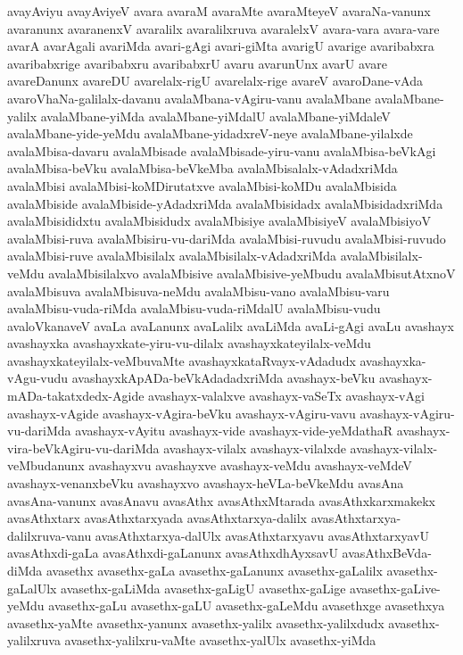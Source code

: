 {avayAviyu
avayAviyeV
avara
avaraM
avaraMte
avaraMteyeV
avaraNa-vanunx
avaranunx
avaranenxV
avaralilx
avaralilxruva
avaralelxV
avara-vara
avara-vare
avarA
avarAgali
avariMda
avari-gAgi
avari-giMta
avarigU
avarige
avaribabxra
avaribabxrige
avaribabxru
avaribabxrU
avaru
avarunUnx
avarU
avare
avareDanunx
avareDU
avarelalx-rigU
avarelalx-rige
avareV
avaroDane-vAda
avaroVhaNa-galilalx-davanu
avalaMbana-vAgiru-vanu
avalaMbane
avalaMbane-yalilx
avalaMbane-yiMda
avalaMbane-yiMdalU
avalaMbane-yiMdaleV
avalaMbane-yide-yeMdu
avalaMbane-yidadxreV-neye
avalaMbane-yilalxde
avalaMbisa-davaru
avalaMbisade
avalaMbisade-yiru-vanu
avalaMbisa-beVkAgi
avalaMbisa-beVku
avalaMbisa-beVkeMba
avalaMbisalalx-vAdadxriMda
avalaMbisi
avalaMbisi-koMDirutatxve
avalaMbisi-koMDu
avalaMbisida
avalaMbiside
avalaMbiside-yAdadxriMda
avalaMbisidadx
avalaMbisidadxriMda
avalaMbisididxtu
avalaMbisidudx
avalaMbisiye
avalaMbisiyeV
avalaMbisiyoV
avalaMbisi-ruva
avalaMbisiru-vu-dariMda
avalaMbisi-ruvudu
avalaMbisi-ruvudo
avalaMbisi-ruve
avalaMbisilalx
avalaMbisilalx-vAdadxriMda
avalaMbisilalx-veMdu
avalaMbisilalxvo
avalaMbisive
avalaMbisive-yeMbudu
avalaMbisutAtxnoV
avalaMbisuva
avalaMbisuva-neMdu
avalaMbisu-vano
avalaMbisu-varu
avalaMbisu-vuda-riMda
avalaMbisu-vuda-riMdalU
avalaMbisu-vudu
avaloVkanaveV
avaLa
avaLanunx
avaLalilx
avaLiMda
avaLi-gAgi
avaLu
avashayx
avashayxka
avashayxkate-yiru-vu-dilalx
avashayxkateyilalx-veMdu
avashayxkateyilalx-veMbuvaMte
avashayxkataRvayx-vAdadudx
avashayxka-vAgu-vudu
avashayxkApADa-beVkAdadadxriMda
avashayx-beVku
avashayx-mADa-takatxdedx-Agide
avashayx-valalxve
avashayx-vaSeTx
avashayx-vAgi
avashayx-vAgide
avashayx-vAgira-beVku
avashayx-vAgiru-vavu
avashayx-vAgiru-vu-dariMda
avashayx-vAyitu
avashayx-vide
avashayx-vide-yeMdathaR
avashayx-vira-beVkAgiru-vu-dariMda
avashayx-vilalx
avashayx-vilalxde
avashayx-vilalx-veMbudanunx
avashayxvu
avashayxve
avashayx-veMdu
avashayx-veMdeV
avashayx-venanxbeVku
avashayxvo
avashayx-heVLa-beVkeMdu
avasAna
avasAna-vanunx
avasAnavu
avasAthx
avasAthxMtarada
avasAthxkarxmakekx
avasAthxtarx
avasAthxtarxyada
avasAthxtarxya-dalilx
avasAthxtarxya-dalilxruva-vanu
avasAthxtarxya-dalUlx
avasAthxtarxyavu
avasAthxtarxyavU
avasAthxdi-gaLa
avasAthxdi-gaLanunx
avasAthxdhAyxsavU
avasAthxBeVda-diMda
avasethx
avasethx-gaLa
avasethx-gaLanunx
avasethx-gaLalilx
avasethx-gaLalUlx
avasethx-gaLiMda
avasethx-gaLigU
avasethx-gaLige
avasethx-gaLive-yeMdu
avasethx-gaLu
avasethx-gaLU
avasethx-gaLeMdu
avasethxge
avasethxya
avasethx-yaMte
avasethx-yanunx
avasethx-yalilx
avasethx-yalilxdudx
avasethx-yalilxruva
avasethx-yalilxru-vaMte
avasethx-yalUlx
avasethx-yiMda
}
